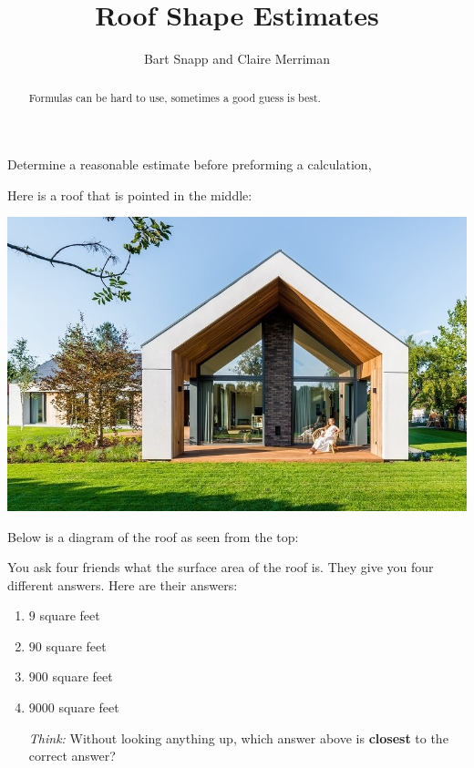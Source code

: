 \documentclass[handout,nooutcomes,noauthor,hints]{ximera}
\title{Roof Shape Estimates}
\author{Bart Snapp and Claire Merriman}
\begin{document}
\begin{abstract}
  Formulas can be hard to use, sometimes a good guess is best.
\end{abstract}
\maketitle

\begin{listObjectives}
 \item Determine a reasonable estimate before preforming a calculation,

\end{listObjectives}


\begin{question}


 Here is a roof that is pointed in the middle:
  \begin{center}
    \includegraphics[width=.5\textwidth]{../formulasGalore/symRoof.jpg}
  \end{center}
  Below is a diagram of the roof as seen from the top:
  \begin{center}
  \end{center}
  You ask four friends what the surface area of the roof is. They give
  you four different answers. Here are their answers:
    \begin{enumerate}
    \item $9$ square feet
    \item $90$ square feet
    \item $900$ square feet
    \item $9000$ square feet
    \end{enumerate}
    \begin{enumerate}
  \item[ \emph{Think:}] Without looking anything up, which answer above is \textbf{closest} to the correct answer? 


\end{enumerate}
\end{question}
\end{document}
